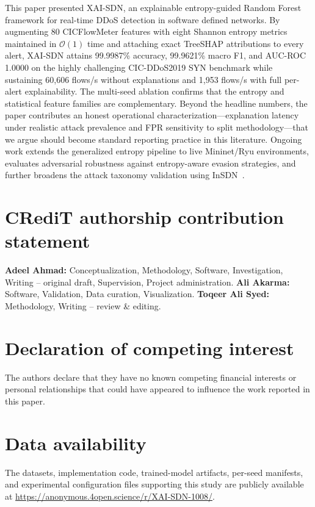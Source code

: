 \documentclass{ieeeaccess}
\begin{document}
This paper presented XAI-SDN, an explainable entropy-guided Random Forest framework for real-time DDoS detection in software defined networks. By augmenting 80 CICFlowMeter features with eight Shannon entropy metrics maintained in $\mathcal{O}(1)$ time and attaching exact TreeSHAP attributions to every alert, XAI-SDN attains 99.9987\% accuracy, 99.9621\% macro F1, and AUC-ROC 1.0000 on the highly challenging CIC-DDoS2019 SYN benchmark while sustaining 60,606 flows/s without explanations and 1,953 flows/s with full per-alert explainability. The multi-seed ablation confirms that the entropy and statistical feature families are complementary. Beyond the headline numbers, the paper contributes an honest operational characterization---explanation latency under realistic attack prevalence and FPR sensitivity to split methodology---that we argue should become standard reporting practice in this literature. Ongoing work extends the generalized entropy pipeline to live Mininet/Ryu environments, evaluates adversarial robustness against entropy-aware evasion strategies, and further broadens the attack taxonomy validation using InSDN~\cite{elsayed2020insdn}.

\section*{CRediT authorship contribution statement}
\textbf{Adeel Ahmad:} Conceptualization, Methodology, Software, Investigation, Writing -- original draft, Supervision, Project administration. \textbf{Ali Akarma:} Software, Validation, Data curation, Visualization. \textbf{Toqeer Ali Syed:} Methodology, Writing -- review \& editing.

\section*{Declaration of competing interest}
The authors declare that they have no known competing financial interests or personal relationships that could have appeared to influence the work reported in this paper.

\section*{Data availability}
The datasets, implementation code, trained-model artifacts, per-seed manifests, and experimental configuration files supporting this study are publicly available at \url{https://anonymous.4open.science/r/XAI-SDN-1008/}.
\end{document}
